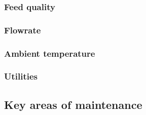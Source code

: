 \subsubsection{Feed quality}

\subsubsection{Flowrate}

\subsubsection{Ambient temperature}

\subsubsection{Utilities}


\subsection{Key areas of maintenance}